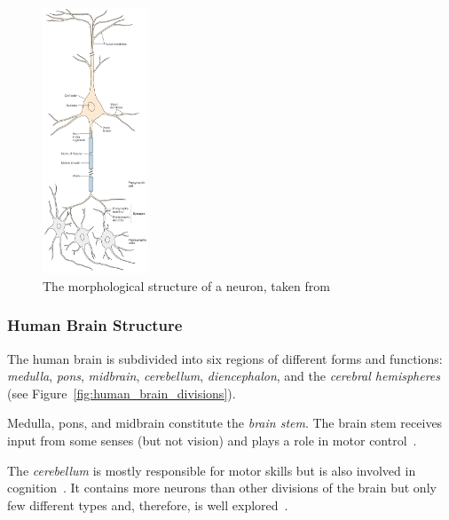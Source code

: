 \begin{figure}
    \begin{center}
        \includegraphics[width=0.28\textwidth]{images/neuron.jpeg}
    \end{center}
    \caption[Neuron structure]{The morphological structure of a neuron, taken from \citet[p. 22]{mack2013principles}}
    \label{fig:neuron_structure}
\end{figure}

\subsubsection{Human Brain Structure}

The human brain is subdivided into six regions of different forms and functions: \textit{medulla}, \textit{pons}, \textit{midbrain}, \textit{cerebellum}, \textit{diencephalon}, and the \textit{cerebral hemispheres}~\citep[p. 340]{mack2013principles} (see Figure~\ref{fig:human_brain_divisions}).

Medulla, pons, and midbrain constitute the \textit{brain stem}.
The brain stem receives input from some senses (but not vision) and plays a role in motor control~\citep[p. 341]{mack2013principles}.

The \textit{cerebellum} is mostly responsible for motor skills but is also involved in cognition~\citep[p. 341]{mack2013principles}.
It contains more neurons than other divisions of the brain but only few different types and, therefore, is well explored~\citep[p. 341]{mack2013principles}.

